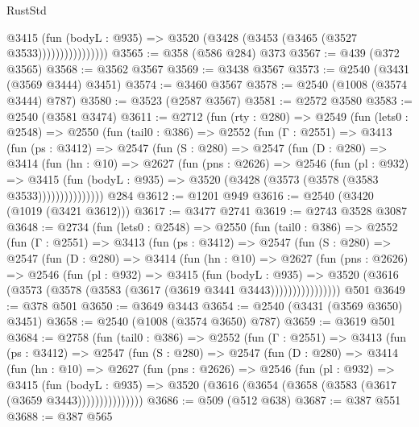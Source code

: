 \begin{lexlean}{RustStd}
\begin{coremodule}
                        @3415
                          (fun (bodyL : @935) =>
                          @3520 (@3428 (@3453 (@3465 (@3527 @3533))))))))))))))))
@3565 := @358 (@586 @284) @373
@3567 := @439 (@372 @3565)
@3568 := @3562 @3567
@3569 := @3438 @3567
@3573 := @2540 (@3431 (@3569 @3444) @3451)
@3574 := @3460 @3567
@3578 := @2540 (@1008 (@3574 @3444) @787)
@3580 := @3523 (@2587 @3567)
@3581 := @2572 @3580
@3583 := @2540 (@3581 @3474)
@3611 := @2712
    (fun (rty : @280) =>
    @2549
      (fun (lets0 : @2548) =>
      @2550
        (fun (tail0 : @386) =>
        @2552
          (fun (Γ : @2551) =>
          @3413
            (fun (ps : @3412) =>
            @2547
              (fun (S : @280) =>
              @2547
                (fun (D : @280) =>
                @3414
                  (fun (hn : @10) =>
                  @2627
                    (fun (pns : @2626) =>
                    @2546
                      (fun (pl : @932) =>
                      @3415
                        (fun (bodyL : @935) =>
                        @3520 (@3428 (@3573 (@3578 (@3583 @3533)))))))))))))))
    @284
@3612 := @1201 @949
@3616 := @2540 (@3420 (@1019 (@3421 @3612)))
@3617 := @3477 @2741
@3619 := @2743 @3528 @3087
@3648 := @2734
    (fun (lets0 : @2548) =>
    @2550
      (fun (tail0 : @386) =>
      @2552
        (fun (Γ : @2551) =>
        @3413
          (fun (ps : @3412) =>
          @2547
            (fun (S : @280) =>
            @2547
              (fun (D : @280) =>
              @3414
                (fun (hn : @10) =>
                @2627
                  (fun (pns : @2626) =>
                  @2546
                    (fun (pl : @932) =>
                    @3415
                      (fun (bodyL : @935) =>
                      @3520 (@3616 (@3573 (@3578 (@3583 (@3617 (@3619 @3441 @3443))))))))))))))))
    @501
@3649 := @378 @501
@3650 := @3649 @3443
@3654 := @2540 (@3431 (@3569 @3650) @3451)
@3658 := @2540 (@1008 (@3574 @3650) @787)
@3659 := @3619 @501
@3684 := @2758
    (fun (tail0 : @386) =>
    @2552
      (fun (Γ : @2551) =>
      @3413
        (fun (ps : @3412) =>
        @2547
          (fun (S : @280) =>
          @2547
            (fun (D : @280) =>
            @3414
              (fun (hn : @10) =>
              @2627
                (fun (pns : @2626) =>
                @2546
                  (fun (pl : @932) =>
                  @3415
                    (fun (bodyL : @935) =>
                    @3520 (@3616 (@3654 (@3658 (@3583 (@3617 (@3659 @3443)))))))))))))))
@3686 := @509 (@512 @638)
@3687 := @387 @551
@3688 := @387 @565

\end{coremodule}
\end{lexlean}
